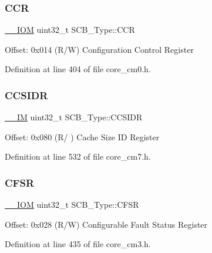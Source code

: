 \subsubsection{\texorpdfstring{C\+CR}{CCR}}
{\footnotesize\ttfamily \hyperlink{core__sc300_8h_ab6caba5853a60a17e8e04499b52bf691}{\+\_\+\+\_\+\+I\+OM} uint32\+\_\+t S\+C\+B\+\_\+\+Type\+::\+C\+CR}

Offset\+: 0x014 (R/W) Configuration Control Register 

Definition at line 404 of file core\+\_\+cm0.\+h.

\mbox{\label{struct_s_c_b___type_afd063c9297a1a3b67e6d1d5e179e6a0e}} 
\subsubsection{\texorpdfstring{C\+C\+S\+I\+DR}{CCSIDR}}
{\footnotesize\ttfamily \hyperlink{core__sc300_8h_a4cc1649793116d7c2d8afce7a4ffce43}{\+\_\+\+\_\+\+IM} uint32\+\_\+t S\+C\+B\+\_\+\+Type\+::\+C\+C\+S\+I\+DR}

Offset\+: 0x080 (R/ ) Cache Size ID Register 

Definition at line 532 of file core\+\_\+cm7.\+h.

\mbox{\label{struct_s_c_b___type_a0cda9e061b42373383418663092ad19a}} 
\subsubsection{\texorpdfstring{C\+F\+SR}{CFSR}}
{\footnotesize\ttfamily \hyperlink{core__sc300_8h_ab6caba5853a60a17e8e04499b52bf691}{\+\_\+\+\_\+\+I\+OM} uint32\+\_\+t S\+C\+B\+\_\+\+Type\+::\+C\+F\+SR}

Offset\+: 0x028 (R/W) Configurable Fault Status Register 

Definition at line 435 of file core\+\_\+cm3.\+h.

\mbox{\label{struct_s_c_b___type_ad9899f5775251cf5ef0cb0845527afc2}} 
